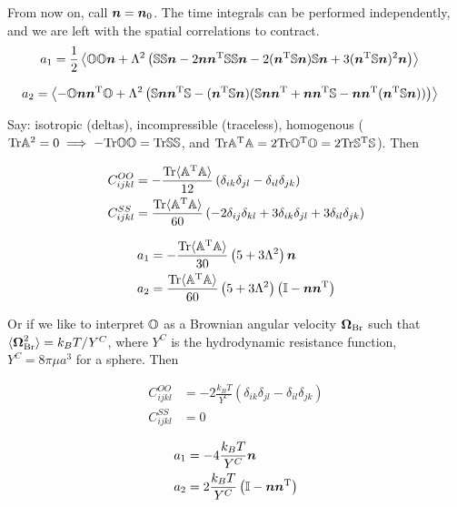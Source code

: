 \documentclass[thesis.tex]{subfiles}
\begin{document}
From now on, call $\mbox{\boldmath$n$} = \mbox{\boldmath$n$}_0$. The time integrals can be performed independently, and we are left with the spatial correlations to contract. 
\begin{align*}
	a_1 &= \frac{1}{2}\left \langle \mathbb{O} \mathbb{O} \mbox{\boldmath$n$} + \Lambda^2\left(
\mathbb{S} \mathbb{S} \mbox{\boldmath$n$}
-2 \mbox{\boldmath$n$} \mbox{\boldmath$n$}^{\mathrm T} \mathbb{S}\mathbb{S}\mbox{\boldmath$n$}
-2 (\mbox{\boldmath$n$}^{\mathrm T} \mathbb{S}\mbox{\boldmath$n$})\mathbb{S} \mbox{\boldmath$n$} 
+3 (\mbox{\boldmath$n$}^{\mathrm T} \mathbb{S}\mbox{\boldmath$n$})^2 \mbox{\boldmath$n$}
\right) \right\rangle
\end{align*}

\begin{align*}
	a_2  &= \left\langle -\mathbb{O} \mbox{\boldmath$n$} \mbox{\boldmath$n$}^{\mathrm T} \mathbb{O} + \Lambda^2\left( \mathbb{S} \mbox{\boldmath$n$} \mbox{\boldmath$n$}^{\mathrm T}\mathbb{S} -(\mbox{\boldmath$n$}^{\mathrm T} \mathbb{S} \mbox{\boldmath$n$})(\mathbb{S} \mbox{\boldmath$n$} \mbox{\boldmath$n$}^{\mathrm T} + \mbox{\boldmath$n$} \mbox{\boldmath$n$}^{\mathrm T} \mathbb{S} - \mbox{\boldmath$n$} \mbox{\boldmath$n$}^{\mathrm T}(\mbox{\boldmath$n$}^{\mathrm T} \mathbb{S} \mbox{\boldmath$n$}))\right) \right\rangle
\end{align*}

Say: isotropic (deltas), incompressible (traceless), homogenous ($\mbox{Tr} \mathbb{A}^2=0\implies-\mbox{Tr} \mathbb{O}\mathbb{O}=\mbox{Tr}\mathbb{S}\mathbb{S}$, and $\mbox{Tr} \mathbb{A} ^{\mathrm T} \mathbb{A} = 2\mbox{Tr} \mathbb{O}^{\mathrm T} \mathbb{O} = 2\mbox{Tr} \mathbb{S}^{\mathrm T}\mathbb{S}$). Then

\begin{align*}
	C^{OO}_{ijkl} &= -\frac{\mbox{Tr}\langle\mathbb{A}^{\mathrm T}\mathbb{A}\rangle}{12}\left(\delta_{ik}\delta_{jl}-\delta_{il}\delta_{jk}\right)\\
	C^{SS}_{ijkl} &= \frac{\mbox{Tr}\langle\mathbb{A}^{\mathrm T}\mathbb{A}\rangle}{60}\left(-2\delta_{ij}\delta_{kl}+3\delta_{ik}\delta_{jl}+3\delta_{il}\delta_{jk}\right)	
\end{align*}

\begin{align*}
	a_1 &= -\frac{\mbox{Tr}\langle\mathbb{A}^{\mathrm T} \mathbb{A}\rangle}{30} \left(5 + 3\Lambda^2 \right)\mbox{\boldmath$n$}\\
	a_2  &= \frac{\mbox{Tr}\langle\mathbb{A}^{\mathrm T} \mathbb{A}\rangle}{60} \left(5 + 3\Lambda^2 \right)\left(\mathbb{I} - \mbox{\boldmath$n$}\mbox{\boldmath$n$}^{\mathrm T} \right )
\end{align*}

Or if we like to interpret $\mathbb{O}$ as a Brownian angular velocity $\mbox{\boldmath$\Omega$}_\mathrm{Br}$ such that $\langle \mbox{\boldmath$\Omega$}_\mathrm{Br}^2\rangle=k_B T/Y^C$, where $Y^C$ is the hydrodynamic resistance function, $Y^C=8 \pi \mu a^3$ for a sphere. Then

\begin{align*}
	C^{OO}_{ijkl} &= -2\frac{k_B T}{Y^C} \left(\delta_{ik}\delta_{jl}-\delta_{il}\delta_{jk}\right)\\
	C^{SS}_{ijkl} &= 0	
\end{align*}

\begin{align*}
	a_1 &= -4 \frac{k_B T}{Y^C} \mbox{\boldmath$n$}\\
	a_2 &= 2 \frac{k_B T}{Y^C} \left(\mathbb{I} - \mbox{\boldmath$n$}\mbox{\boldmath$n$}^{\mathrm T} \right)
\end{align*}
\end{document}

